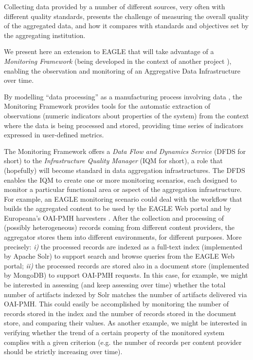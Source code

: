 \documentclass[amsthm,ebook]{saparticle}
\begin{document}
Collecting data provided by a number of different sources, very often with different quality standards, presents the challenge of measuring the overall quality of the aggregated data, and how it compares with standards and objectives set by the aggregating institution.

We present here an extension to EAGLE that will take advantage of a \textit{Monitoring Framework} (being developed in the context of another project \citep{openaire}), enabling the observation and monitoring of an Aggregative Data Infrastructure over time. 

By modelling ``data processing'' as a manufacturing process involving data \citep{ballou1998}, the Monitoring Framework provides tools for the automatic extraction of observations (numeric indicators about properties of the system) from the context where the data is being processed and stored, providing time series of indicators expressed in user-defined metrics.

The Monitoring Framework offers a \textit{Data Flow and Dynamics Service} (DFDS for short) to the \textit{Infrastructure Quality Manager} (IQM for short), a role that (hopefully) will become standard in data aggregation infrastructures. The DFDS enables the IQM to create one or more monitoring scenarios, each designed to monitor a particular functional area or aspect of the aggregation infrastructure. For example, an EAGLE monitoring scenario could deal with the workflow that builds the aggregated content to be used by the EAGLE Web portal and by Europeana’s OAI-PMH harvesters \citep{mannocci2014}. After the collection and processing of (possibly heterogeneous) records coming from different content providers, the aggregator stores them into different environments, for different purposes. More precisely: \textit{i)} the processed records are indexed as a full-text index (implemented by Apache Solr) to support search and browse queries from the EAGLE Web portal; \textit{ii)} the processed records are stored also in a document store (implemented by MongoDB) to support OAI-PMH requests. In this case, for example, we might be interested in assessing (and keep assessing over time) whether the total number of artifacts indexed by Solr matches the number of artifacts delivered via OAI-PMH. This could easily be accomplished by monitoring the number of records stored in the index and the number of records stored in the document store, and comparing their values. As another example, we might be interested in verifying whether the trend of a certain property of the monitored system complies with a given criterion (e.g. the number of records per content provider should be strictly increasing over time).
\end{document}
